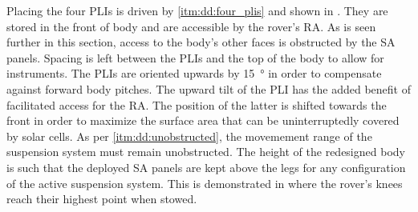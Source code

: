 Placing the four \acp{PLI} is driven by \ref{itm:dd:four_plis} and shown in . They are stored in the front of body and are accessible by the rover's \ac{RA}. As is seen further in this section, access to the body's other faces is obstructed by the \ac{SA} panels. Spacing is left between the \acp{PLI} and the top of the body to allow for instruments. The \acp{PLI} are oriented upwards by \SI{15}{\degree} in order to compensate against forward body pitches. The upward tilt of the \ac{PLI} has the added benefit of facilitated access for the \ac{RA}. The position of the latter is shifted towards the front in order to maximize the surface area that can be uninterruptedly covered by solar cells. As per \ref{itm:dd:unobstructed}, the movemement range of the suspension system must remain unobstructed. The height of the redesigned body is such that the deployed \ac{SA} panels are kept above the legs for any configuration of the active suspension system. This is demonstrated in  where the rover's knees reach their highest point when stowed.

